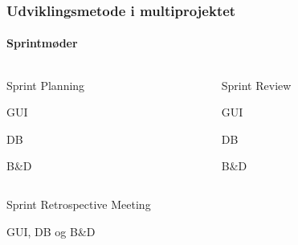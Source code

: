 \begin{frame}
    \frametitle{Udviklingsmetode i multiprojektet}
    \framesubtitle{Sprintmøder}
    \begin{columns}
    \begin{column}{0.45\textwidth}
      \begin{mtjbox}[backgroundcolor=color1!5, linecolor=color1!40]
        Sprint Planning
            \begin{mtjbox}
              GUI
            \end{mtjbox}\unskip
            \begin{mtjbox}
              DB
            \end{mtjbox}\unskip
            \begin{mtjbox}
              B\&D
            \end{mtjbox}\unskip
      \end{mtjbox}
    \end{column}
    \pause
    \begin{column}{0.45\textwidth}
      \begin{mtjbox}[backgroundcolor=color1!5, linecolor=color1!40]
        Sprint Review
            \begin{mtjbox}
              GUI
            \end{mtjbox}\unskip
            \begin{mtjbox}
              DB
            \end{mtjbox}\unskip
            \begin{mtjbox}
              B\&D
            \end{mtjbox}\unskip
      \end{mtjbox}
    \end{column}
    \end{columns}
    \pause
    \begin{mtjbox}[backgroundcolor=color1!5, linecolor=color1!40]
      Sprint Retrospective Meeting
      \begin{mtjbox}
              GUI, DB og B\&D
            \end{mtjbox}
    \end{mtjbox}
\end{frame}


